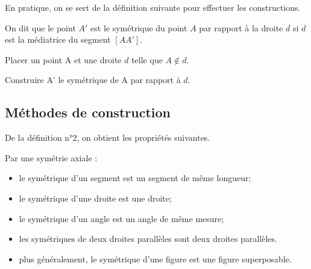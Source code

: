 \documentclass[a4paper]{book}
\begin{document}
    En pratique, on se sert de la définition suivante pour effectuer les constructions.  

    \begin{definition}
        On dit que le point \( A' \) est le symétrique du point \( A \) par rapport à la droite $d$ si \( d \) est la médiatrice du segment \([AA']\).
    \end{definition}

    \begin{exemple}
        Placer un point A et une droite $d$ telle que $A\notin d$.

        Construire A' le symétrique de A par rapport à $d$.
    \end{exemple}


\newpage


\subsection{Méthodes de construction}

    De la définition n°2, on obtient les propriétés suivantes.
    \begin{propriete}
        Par une symétrie axiale : 
        \begin{itemize}
            \item le symétrique d'un segment est un segment de même longueur;
            \item le symétrique d'une droite est une droite;
            \item le symétrique d'un angle est un angle de même mesure;
            \item les symétriques de deux droites parallèles sont deux droites parallèles. 
            \item plus généralement, le symétrique d'une figure est une figure superposable.
        \end{itemize}
    \end{propriete}
\end{document}

